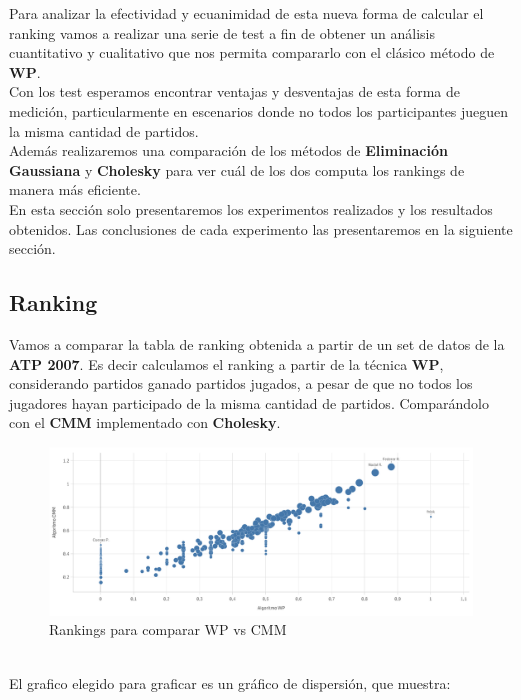 Para analizar la efectividad y ecuanimidad de esta nueva forma de calcular el ranking vamos a realizar una serie de test a fin de obtener un análisis cuantitativo y cualitativo
que nos permita compararlo con el clásico método de \textbf{WP}. \\
Con los test esperamos encontrar ventajas y desventajas de esta forma de medición, particularmente en escenarios donde no todos los participantes jueguen la misma cantidad de partidos.
\\

Además realizaremos una comparación de los métodos de \textbf{Eliminación Gaussiana} y \textbf{Cholesky} para ver cuál de los dos computa los rankings de manera más eficiente.
\\

En esta sección solo presentaremos los experimentos realizados y los resultados obtenidos. Las conclusiones de cada experimento
las presentaremos en la siguiente sección.

\subsection{Ranking}

Vamos a comparar la tabla de ranking obtenida a partir de un set de datos de la \textbf{ATP 2007}. Es decir calculamos el ranking a partir de la técnica \textbf{WP}, considerando
partidos ganado \/ partidos jugados, a pesar de que no todos los jugadores hayan participado de la misma cantidad de partidos. Comparándolo con el \textbf{CMM} implementado con \textbf{Cholesky}. \\


\begin{figure}[H]
    \centering
    \includegraphics[width=1\textwidth]{IMG/Comparativa WP- CMM todos.png}
    \caption{Rankings para comparar WP vs CMM}
    \label{fig:Comparacion de tecnicas}
\end{figure}

\\
El grafico elegido para graficar es un gráfico de dispersión, que muestra: \\

